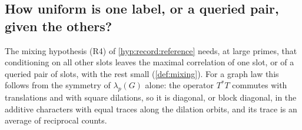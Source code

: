\subsection{How uniform is one label, or a queried pair, given the others?}\label{subsec:labellings:trace}

The mixing hypothesis (R4) of \cref{hyp:record:reference} needs, at large primes, that conditioning on all other
slots leaves the maximal correlation of one slot, or of a queried pair of slots, with the rest small (\cref{def:mixing}). For a graph law this follows from the symmetry of
$\lambda_p(G)$ alone: the operator $T^*T$ commutes with translations and with
square dilations, so it is diagonal, or block diagonal, in the additive
characters with equal traces along the dilation orbits, and its trace is an
average of reciprocal counts.

